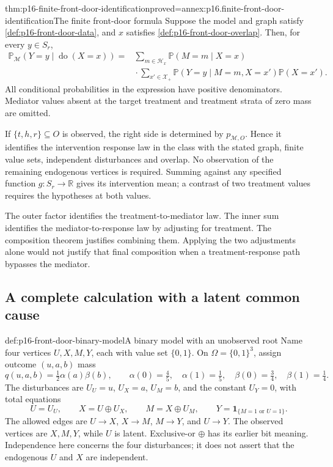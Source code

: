 \begin{hbtheorem}{thm:p16-finite-front-door-identification}{proved=annex:p16.finite-front-door-identification}{The finite front-door formula}
Suppose the model and graph satisfy \cref{def:p16-front-door-data},
and \(x\) satisfies \cref{def:p16-front-door-overlap}. Then, for
every \(y\in S_r\),
\[
\begin{aligned}
 \mathbb P_{\mathcal M}(Y=y\mid\operatorname{do}(X=x))
 ={}&\sum_{m\in\mathcal H_x}\mathbb P(M=m\mid X=x)\\[-2pt]
 &{}\cdot\sum_{x'\in\mathcal X_+}
       \mathbb P(Y=y\mid M=m,X=x')\mathbb P(X=x').
\end{aligned}
\]
All conditional probabilities in the expression have positive
denominators. Mediator values absent at the target treatment and
treatment strata of zero mass are omitted.

If \(\{t,h,r\}\subseteq O\) is observed, the right side is
determined by \(p_{\mathcal M,O}\). Hence it identifies the
intervention response law in the class with the stated graph, finite
value sets, independent disturbances and overlap. No observation of
the remaining endogenous vertices is required. Summing against any
specified function \(g:S_r\to\mathbb R\) gives its intervention mean; a contrast
of two treatment values requires the hypotheses at both values.
\end{hbtheorem}

The outer factor identifies the treatment-to-mediator law. The inner
sum identifies the mediator-to-response law by adjusting for treatment.
The composition theorem justifies combining them. Applying the two
adjustments alone would not justify that final composition when a
treatment-response path bypasses the mediator.

\subsection{A complete calculation with a latent common cause}

\begin{hbdefinition}{def:p16-front-door-binary-model}{A binary model with an unobserved root}
Name four vertices \(U,X,M,Y\), each with value set \(\{0,1\}\).
On \(\Omega=\{0,1\}^3\), assign outcome \((u,a,b)\) mass
\[
 q(u,a,b)=\tfrac12\alpha(a)\beta(b),\qquad
 \alpha(0)=\tfrac45,\quad\alpha(1)=\tfrac15,\quad
 \beta(0)=\tfrac34,\quad\beta(1)=\tfrac14.
\]
The disturbances are \(U_U=u\), \(U_X=a\), \(U_M=b\), and
the constant \(U_Y=0\), with total equations
\[
 U=U_U,\qquad X=U\oplus U_X,\qquad
 M=X\oplus U_M,\qquad
 Y=\mathbf1_{\{M=1\text{ or }U=1\}}.
\]
The allowed edges are \(U\to X\), \(X\to M\), \(M\to Y\),
and \(U\to Y\). The observed vertices are \(X,M,Y\), while
\(U\) is latent. Exclusive-or \(\oplus\) has its earlier bit
meaning. Independence here concerns the four disturbances; it does
not assert that the endogenous \(U\) and \(X\) are independent.
\end{hbdefinition}

